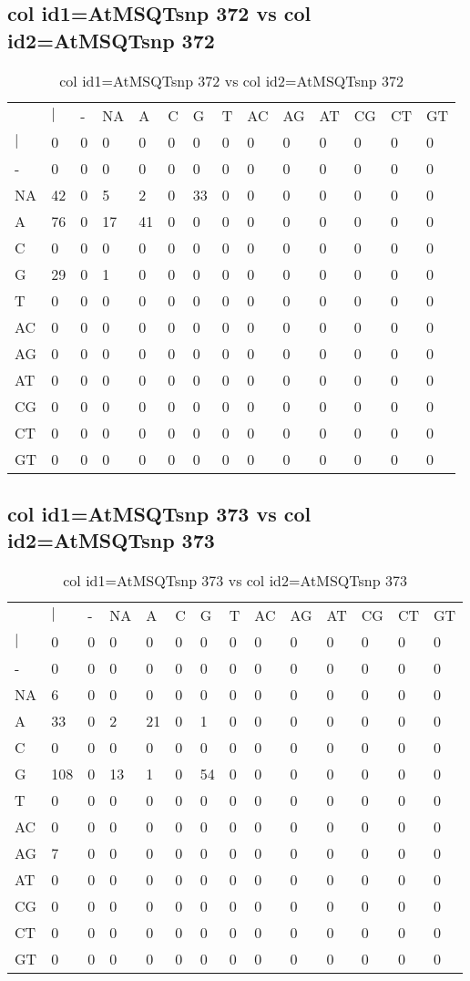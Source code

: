 \subsection{col id1=AtMSQTsnp 372 vs col id2=AtMSQTsnp 372}
\begin{center}
\begin{longtable}{|l|l|l|l|l|l|l|l|l|l|l|l|l|l|}
\caption{col id1=AtMSQTsnp 372 vs col id2=AtMSQTsnp 372} \label{table_dm696}\\
\hline
\\
\hline
&$|$&-&NA&A&C&G&T&AC&AG&AT&CG&CT&GT\\
$|$&0&0&0&0&0&0&0&0&0&0&0&0&0\\
-&0&0&0&0&0&0&0&0&0&0&0&0&0\\
NA&42&0&5&2&0&33&0&0&0&0&0&0&0\\
A&76&0&17&41&0&0&0&0&0&0&0&0&0\\
C&0&0&0&0&0&0&0&0&0&0&0&0&0\\
G&29&0&1&0&0&0&0&0&0&0&0&0&0\\
T&0&0&0&0&0&0&0&0&0&0&0&0&0\\
AC&0&0&0&0&0&0&0&0&0&0&0&0&0\\
AG&0&0&0&0&0&0&0&0&0&0&0&0&0\\
AT&0&0&0&0&0&0&0&0&0&0&0&0&0\\
CG&0&0&0&0&0&0&0&0&0&0&0&0&0\\
CT&0&0&0&0&0&0&0&0&0&0&0&0&0\\
GT&0&0&0&0&0&0&0&0&0&0&0&0&0\\
\hline
\end{longtable}
\end{center}

\subsection{col id1=AtMSQTsnp 373 vs col id2=AtMSQTsnp 373}
\begin{center}
\begin{longtable}{|l|l|l|l|l|l|l|l|l|l|l|l|l|l|}
\caption{col id1=AtMSQTsnp 373 vs col id2=AtMSQTsnp 373} \label{table_dm698}\\
\hline
\\
\hline
&$|$&-&NA&A&C&G&T&AC&AG&AT&CG&CT&GT\\
$|$&0&0&0&0&0&0&0&0&0&0&0&0&0\\
-&0&0&0&0&0&0&0&0&0&0&0&0&0\\
NA&6&0&0&0&0&0&0&0&0&0&0&0&0\\
A&33&0&2&21&0&1&0&0&0&0&0&0&0\\
C&0&0&0&0&0&0&0&0&0&0&0&0&0\\
G&108&0&13&1&0&54&0&0&0&0&0&0&0\\
T&0&0&0&0&0&0&0&0&0&0&0&0&0\\
AC&0&0&0&0&0&0&0&0&0&0&0&0&0\\
AG&7&0&0&0&0&0&0&0&0&0&0&0&0\\
AT&0&0&0&0&0&0&0&0&0&0&0&0&0\\
CG&0&0&0&0&0&0&0&0&0&0&0&0&0\\
CT&0&0&0&0&0&0&0&0&0&0&0&0&0\\
GT&0&0&0&0&0&0&0&0&0&0&0&0&0\\
\hline
\end{longtable}
\end{center}

